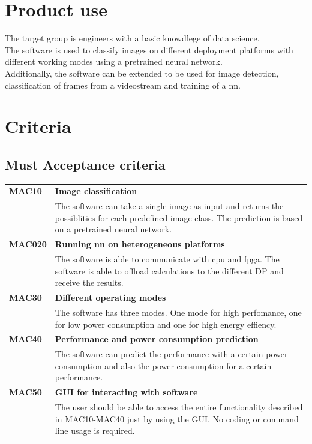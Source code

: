 \documentclass[parskip=full]{scrartcl}
\begin{document}
\section{Product use}
The target group is engineers with a basic knowdlege of data science.\\
The software is used to classify images on different deployment platforms with different working modes using a pretrained neural network.\\
Additionally, the software can be extended to be used for image detection, classification of frames from a videostream and training of a \gls{nn}.\\


\section{Criteria}
\subsection{Must Acceptance criteria}
\begin{tabular}{p{2cm}p{12cm}}
\textbf{MAC10} & \textbf{Image classification} \\
& The software can take a single image as input and returns the possiblities for each predefined image class. The prediction is based on a pretrained neural network.\\
\textbf{MAC020} & \textbf{Running \gls{nn} on heterogeneous platforms} \\
& The software is able to communicate with \gls{cpu} and \gls{fpga}. The software is able to offload calculations to the different DP and receive the results.\\
\textbf{MAC30} & \textbf{Different operating modes} \\
& The software has three modes. One mode for high perfomance, one for low power consumption and one for high energy effiency. \\
\textbf{MAC40} & \textbf{Performance and power consumption prediction}\\
& The software can predict the performance with a certain power consumption and also the power consumption for a certain performance.\\
\textbf{MAC50} & \textbf{GUI for interacting with software} \\
& The user should be able to access the entire functionality described in MAC10-MAC40 just by using the GUI. No coding or command line usage is required.
\end{tabular}
\end{document}
